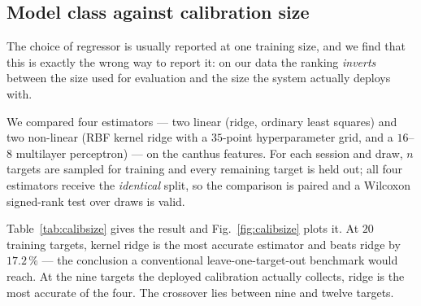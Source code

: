 \documentclass[conference]{IEEEtran}
\begin{document}
\subsection{Model class against calibration size}
\label{sec:calibsize}

The choice of regressor is usually reported at one training size, and we find
that this is exactly the wrong way to report it: on our data the ranking
\emph{inverts} between the size used for evaluation and the size the system
actually deploys with.

We compared four estimators --- two linear (ridge, ordinary least squares) and
two non-linear (RBF kernel ridge with a $35$-point hyperparameter grid, and a
$16$--$8$ multilayer perceptron) --- on the canthus features. For each session
and draw, $n$ targets are sampled for training and every remaining target is
held out; all four estimators receive the \emph{identical} split, so the
comparison is paired and a Wilcoxon signed-rank test over draws is valid.

Table~\ref{tab:calibsize} gives the result and Fig.~\ref{fig:calibsize} plots
it. At $20$ training targets, kernel ridge is the most accurate estimator and
beats ridge by $17.2\,\%$ --- the conclusion a conventional leave-one-target-out
benchmark would reach. At the nine targets the deployed calibration actually
collects, ridge is the most accurate of the four. The crossover lies between
nine and twelve targets.
\end{document}
